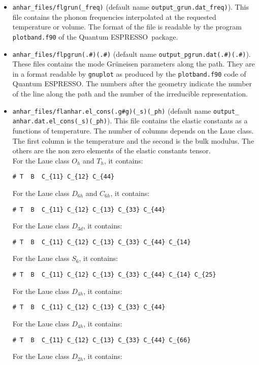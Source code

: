 \documentclass[12pt,a4paper,twoside]{report}
\def\qe{{\sc Quantum ESPRESSO}}
\begin{document}
\begin{itemize}
\item 
\texttt{anhar\_files/flgrun(\_freq)} 
(default name \texttt{output\_grun.dat\_freq)}).
This file contains the phonon frequencies interpolated at the requested 
temperature or volume. The format of the file is readable by the program
\texttt{plotband.f90} of the \qe\ package.

\item 
\texttt{anhar\_files/flpgrun(.\#)(.\#)} 
(default name \texttt{output\_pgrun.dat(.\#)(.\#)}).
These files contains the mode Gr\"uneisen parameters along the path.
They are in a format readable by \texttt{gnuplot} as produced by 
the \texttt{plotband.f90} code of \qe. The numbers after the geometry indicate the number of the line 
along the path and the number of the irreducible representation.

\item
\texttt{anhar\_files/flanhar.el\_cons(.g\#g)(\_s)(\_ph)}
(default name \texttt{output\_} \texttt{anhar.dat.el\_cons(\_s)(\_ph)}). 
This file
contains the elastic constants as a functions of temperature. The number
of columns depends on the Laue class. The first column is the 
temperature and the second is the bulk modulus. The others are the
non zero elements of the elastic constants tensor. \\ 
For the Laue class $O_h$ and $T_h$, it contains:
\begin{verbatim}
# T  B  C_{11} C_{12} C_{44}   
\end{verbatim}
For the Laue class $D_{6h}$ and $C_{6h}$, it contains:
\begin{verbatim}
# T  B  C_{11} C_{12} C_{13} C_{33} C_{44}  
\end{verbatim}
For the Laue class $D_{3d}$, it contains:
\begin{verbatim}
# T  B  C_{11} C_{12} C_{13} C_{33} C_{44} C_{14}  
\end{verbatim}
For the Laue class $S_{6}$, it contains:
\begin{verbatim}
# T  B  C_{11} C_{12} C_{13} C_{33} C_{44} C_{14} C_{25}  
\end{verbatim}
For the Laue class $D_{4h}$, it contains:
\begin{verbatim}
# T  B  C_{11} C_{12} C_{13} C_{33} C_{44}  
\end{verbatim}
For the Laue class $D_{4h}$, it contains:
\begin{verbatim}
# T  B  C_{11} C_{12} C_{13} C_{33} C_{44} C_{66} 
\end{verbatim}
For the Laue class $D_{2h}$, it contains:

\end{itemize}
\end{document}
